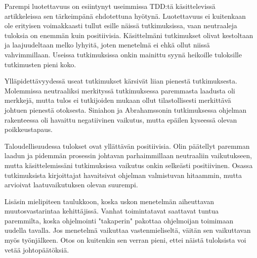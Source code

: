 \documentclass[finnish]{tktltiki2}
\theoremstyle{definition}
\theoremstyle{remark}
\begin{document}
Parempi luotettavuus on esiintynyt useimmissa TDD:tä käsittelevissä artikkeleissa sen tärkeimpänä ehdotettuna hyötynä. Luotettavuus ei kuitenkaan ole erityisen voimakkaasti tullut esille näissä tutkimuksissa, vaan neutraaleja tuloksia on enemmän kuin positiivisia. Käsittelmäni tutkimukset olivat  kestoltaan ja laajuudeltaan melko lyhyitä, joten menetelmä ei ehkä ollut niissä vahvimmillaan. Useissa tutkimuksissa onkin mainittu syynä heikoille tuloksille tutkimusten pieni koko. 

Ylläpidettävyydessä useat tutkimukset kärsivät liian pienestä tutkimuksesta. Molemmissa neutraaliksi merkityssä tutkimuksessa paremmasta laadusta oli merkkejä, mutta tulos ei tutkijoiden mukaan ollut tilastollisesti merkittävä johtuen pienestä otoksesta. Siniahon ja Abrahamssonin tutkimuksessa ohjelman rakenteessa oli havaittu negatiivinen vaikutus, mutta epäilen kyseessä olevan poikkeustapaus. 

Taloudellisuudessa tulokset ovat yllättävän positiivisia. Olin päätellyt paremman laadun ja pidemmän prosessin johtavan parhaimmillaan neutraaliin vaikutukseen, mutta käsittelemissäni tutkimuksissa vaikutus onkin selkeästi positiivinen. Osassa tutkimuksista kirjoittajat havaitsivat ohjelman valmistuvan hitaammin, mutta arvioivat laatuvaikutuksen olevan suurempi.

Lisäsin mielipiteen taulukkoon, koska uskon menetelmän aiheuttavan muutosvastarintaa kehittäjissä. Vanhat toimintatavat saattavat tuntua paremmilta, koska ohjelmointi "takaperin" pakottaa ohjelmoijan toimimaan uudella tavalla. Jos menetelmä vaikuttaa vastenmieliseltä, väitän sen vaikuttavan myös työnjälkeen. Otos on kuitenkin sen verran pieni, ettei näistä tuloksista voi vetää johtopäätöksiä. 









 















%
%
% 
%









% 
\end{document}
